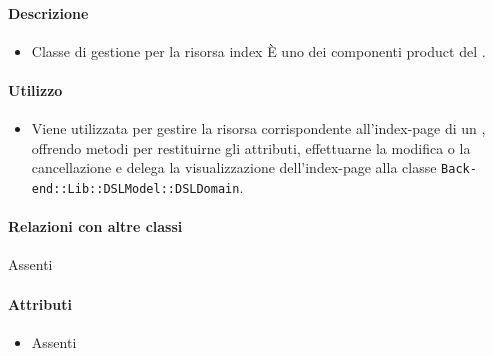 \paragraph*{Descrizione}
\begin{itemize}
\item[] Classe di gestione per la risorsa index 
È uno dei componenti product del  .

\end{itemize}

\paragraph*{Utilizzo}
\begin{itemize}
\item[] Viene utilizzata per gestire la risorsa corrispondente all'index-page di un , offrendo metodi per restituirne gli attributi, effettuarne la modifica o la cancellazione e delega la visualizzazione dell'index-page alla classe \texttt{Back-end::Lib::DSLModel::DSLDomain}.

\end{itemize}

\paragraph*{Relazioni con altre classi}
Assenti

\paragraph*{Attributi}
\begin{itemize}
\item[] Assenti
\end{itemize}

